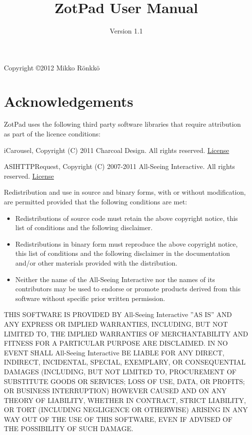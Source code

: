 \documentclass{tufte-book}
\title{ZotPad User Manual}
\date{Version 1.1}
\newcommand{\licensetext}{\scriptsize \setlength{\parskip}{0mm} \singlespacing}
\begin{document}
\maketitle

Copyright \copyright 2012 Mikko R\"onkk\"o

\section{Acknowledgements}

\begin{fullwidth}

\setlength{\parindent}{0pt}

\setlength{\parskip}{\baselineskip}

ZotPad uses the following third party software libraries that require attribution as part of the licence conditions:

iCarousel, Copyright (C) 2011 Charcoal Design. All rights reserved. \href{https://raw.github.com/nicklockwood/iCarousel/104d499da7b107b8baa58ab85c6d0f44d504e957/LICENCE.md}{License}

ASIHTTPRequest, Copyright (C) 2007-2011 All-Seeing Interactive. All rights reserved. \href{https://raw.github.com/pokeb/asi-http-request/3cb0230e547b0d13d88843ec7fc6ed77d69cb7c6/LICENSE}{License}

{\licensetext Redistribution and use in source and binary forms, with or without
modification, are permitted provided that the following conditions are met:

\begin{itemize}

\item Redistributions of source code must retain the above copyright
notice, this list of conditions and the following disclaimer.
       
       
\item Redistributions in binary form must reproduce the above copyright
notice, this list of conditions and the following disclaimer in the
documentation and/or other materials provided with the distribution.

\item Neither the name of the All-Seeing Interactive nor the
names of its contributors may be used to endorse or promote products
derived from this software without specific prior written permission.
\end{itemize}
THIS SOFTWARE IS PROVIDED BY All-Seeing Interactive ''AS IS'' AND ANY
EXPRESS OR IMPLIED WARRANTIES, INCLUDING, BUT NOT LIMITED TO, THE IMPLIED
WARRANTIES OF MERCHANTABILITY AND FITNESS FOR A PARTICULAR PURPOSE ARE
DISCLAIMED. IN NO EVENT SHALL All-Seeing Interactive BE LIABLE FOR ANY
DIRECT, INDIRECT, INCIDENTAL, SPECIAL, EXEMPLARY, OR CONSEQUENTIAL DAMAGES
(INCLUDING, BUT NOT LIMITED TO, PROCUREMENT OF SUBSTITUTE GOODS OR SERVICES;
LOSS OF USE, DATA, OR PROFITS; OR BUSINESS INTERRUPTION) HOWEVER CAUSED AND
ON ANY THEORY OF LIABILITY, WHETHER IN CONTRACT, STRICT LIABILITY, OR TORT
(INCLUDING NEGLIGENCE OR OTHERWISE) ARISING IN ANY WAY OUT OF THE USE OF THIS
SOFTWARE, EVEN IF ADVISED OF THE POSSIBILITY OF SUCH DAMAGE.}


\end{fullwidth}
\end{document}
